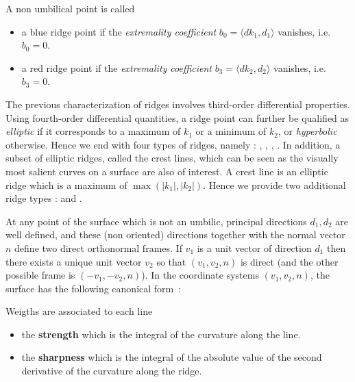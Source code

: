 \begin{definition}
\label{def:ridge-extrema}
A non umbilical point is called
\begin{itemize}
\item
a blue ridge point if the {\em extremality coefficient} $b_0=\langle
dk_1,d_1 \rangle$ vanishes, i.e. $b_0=0$.

\item
a red ridge point if the {\em extremality coefficient} $b_3=\langle
dk_2,d_2 \rangle$ vanishes, i.e. $b_3=0$.

\end{itemize}
\end{definition}
The previous characterization of ridges involves third-order
differential properties. Using fourth-order differential quantities, a
ridge point can further be qualified as {\em elliptic} if it
corresponds to a maximum of $k_1$ or a minimum of $k_2$, or {\em
hyperbolic} otherwise. Hence we end with four types of ridges, namely
: , , ,
.
In addition, a subset of elliptic ridges, called the crest lines,
which can be seen as the visually most salient curves on a surface are
also of interest. A crest line is an elliptic ridge which is a maximum
of $\max(|k_1|,|k_2|)$. Hence we provide two additional ridge types :
 and .



At any point of the surface which is not an umbilic, principal
directions $d_1, d_2$ are well defined, and these (non oriented)
directions together with the normal vector $n$ define two direct
orthonormal frames. If $v_1$ is a unit vector of direction $d_1$ then
there exists a unique unit vector $v_2$ so that $(v_1,v_2,n)$ is
direct (and the other possible frame is $(-v_1,-v_2,n)$). In the
coordinate systems $(v_1,v_2,n)$, the surface has the following
canonical form~:













Weigths are associated to each line
\begin{itemize}
\item
the {\bf strength} which is the integral of the curvature along the
line.
\item
the {\bf sharpness} which is the integral of the absolute value of
the second derivative of the curvature along the ridge.
\end{itemize}

